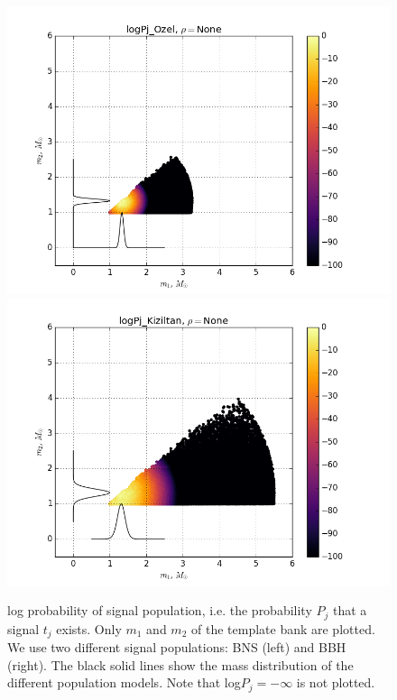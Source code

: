 \documentclass[twocolumn,showpacs,unsortedaddress,superscriptaddress,showkeys,nofootinbib,preprintnumbers,letterpaper]{revtex4-1}
\begin{document}
\begin{figure}
\resizebox{\linewidth}{!}
{\includegraphics{logPj_OzelrhoNone.png}}
\resizebox{\linewidth}{!}
{\includegraphics{logPj_KiziltanrhoNone.png}}
\label{fig:p_j}
\caption{log probability of signal population, i.e. the probability $P_j$ that a signal $t_j$ exists. Only $m_1$ and $m_2$ of the template bank are plotted. We use two different signal populations: BNS (left) and BBH (right). The black solid lines show the mass distribution of the different population models. Note that log$P_j=-\infty$ is not plotted.}
\end{figure}

\end{document}
